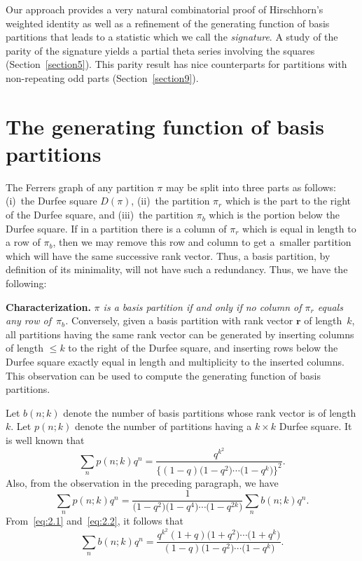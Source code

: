 \documentclass[pdftex]{sigma}
\numberwithin{equation}{section}
\theoremstyle{definition}
\begin{document}
Our approach provides a very natural combinatorial proof of
Hirschhorn's weighted identity
as well as a refinement of the generating function of basis
partitions that leads to a statistic which we call the {\it signature}.
A study of the parity of the signature yields a partial theta series involving
the squares (Section~\ref{section5}). This parity result has nice
counterparts for partitions with non-repeating odd parts (Section~\ref{section9}).

\section{The generating function of basis partitions}\label{section2}

The Ferrers graph of any partition $\pi$ may be split into three
parts as follows: (i)~the Durfee square $D(\pi)$, (ii)~the partition
$\pi_r$ which is the part to the right of the Durfee square, and
(iii)~the partition $\pi_b$ which is the portion below the Durfee
square. If in a partition there is a column of $\pi_r$ which is
equal in length to a row of $\pi_b$, then we may remove this
row and column to get a~smaller partition which will have the
same successive rank vector. Thus, a basis partition, by definition
of its minimality, will not have such a redundancy. Thus, we have
the following:

{\bf Characterization.} \textit{$\pi$ is a basis partition
if and only if no column of $\pi_r$ equals any row of~$\pi_b$.}
Conversely, given a basis partition with rank vector $\mathbf{r}$
of length~$k$, all partitions having the same rank vector can be
generated by inserting columns of length $\le k$ to the right of
the Durfee square, and inserting rows below the Durfee square
exactly equal in length and multiplicity to the inserted columns.
This observation can be used to compute the generating function
of basis partitions.

Let $b(n;k)$ denote the number of basis partitions whose rank vector
is of length $k$. Let $p(n;k)$ denote the number of partitions
having a $k\times k$ Durfee square. It is well known that
\begin{equation}
\sum_{n}p(n;k)q^n=\frac{q^{k^2}}{\bigl\{(1-q)\bigl(1-q^2\bigr)\cdots \bigl(1-q^k\bigr)\bigr\}^2}.\label{eq:2.1}
\end{equation}
Also, from the observation in the preceding paragraph, we have
\begin{equation}
\sum_{n}p(n;k)q^n=\frac{1}{\bigl(1-q^2\bigr)\bigl(1-q^4\bigr)\cdots \bigl(1-q^{2k}\bigr)}
\sum_{n}b(n;k)q^n.\label{eq:2.2}
\end{equation}
From~\eqref{eq:2.1} and~\eqref{eq:2.2}, it follows that
\begin{equation}
\sum_{n}b(n;k)q^n=\frac{q^{k^2}(1+q)\bigl(1+q^2\bigr)\cdots \bigl(1+q^k\bigr)}
{(1-q)\bigl(1-q^2\bigr)\cdots \bigl(1-q^k\bigr)}.\label{eq:2.3}
\end{equation}
\end{document}
